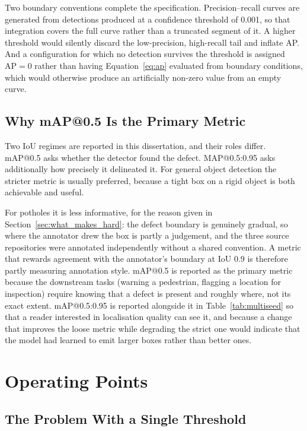 \documentclass[MScCS]{uccthesis}
\begin{document}
Two boundary conventions complete the specification. Precision--recall curves
are generated from detections produced at a confidence threshold of 0.001, so
that integration covers the full curve rather than a truncated segment of it. A
higher threshold would silently discard the low-precision, high-recall tail and
inflate AP. And a configuration for which no detection survives the threshold
is assigned $\mathrm{AP} = 0$ rather than having Equation~\eqref{eq:ap}
evaluated from boundary conditions, which would otherwise produce an
artificially non-zero value from an empty curve.

\subsection{Why mAP@0.5 Is the Primary Metric}

Two IoU regimes are reported in this dissertation, and their roles differ.
mAP@0.5 asks whether the detector found the defect. MAP@0.5:0.95 asks
additionally how precisely it delineated it. For general object detection the
stricter metric is usually preferred, because a tight box on a rigid object is
both achievable and useful.

For potholes it is less informative, for the reason given in
Section~\ref{sec:what_makes_hard}: the defect boundary is genuinely gradual, so
where the annotator drew the box is partly a judgement, and the three source
repositories were annotated independently without a shared convention. A metric
that rewards agreement with the annotator's boundary at IoU 0.9 is therefore
partly measuring annotation style. mAP@0.5 is reported as the primary metric
because the downstream tasks (warning a pedestrian, flagging a location for
inspection) require knowing that a defect is present and roughly where, not
its exact extent. mAP@0.5:0.95 is reported alongside it in
Table~\ref{tab:multiseed} so that a reader
interested in localisation quality can see it, and because a change that
improves the loose metric while degrading the strict one would indicate that
the model had learned to emit larger boxes rather than better ones.

\section{Operating Points}
\label{sec:operating_points}

\subsection{The Problem With a Single Threshold}
\end{document}
